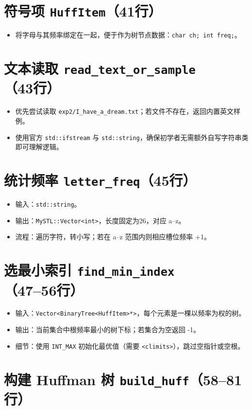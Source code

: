 \documentclass[12pt]{article}
\begin{document}
\section{符号项 \texttt{HuffItem}（41行）}
\begin{itemize}[leftmargin=1.4em]
  \item 将字母与其频率绑定在一起，便于作为树节点数据：\texttt{char ch; int freq;}。
\end{itemize}

\section{文本读取 \texttt{read\_text\_or\_sample}（43行）}
\begin{itemize}[leftmargin=1.4em]
  \item 优先尝试读取 \texttt{exp2/I\_have\_a\_dream.txt}；若文件不存在，返回内置英文样例。
  \item 使用官方 \texttt{std::ifstream} 与 \texttt{std::string}，确保初学者无需额外自写字符串类即可理解逻辑。
\end{itemize}

\section{统计频率 \texttt{letter\_freq}（45行）}
\begin{itemize}[leftmargin=1.4em]
  \item 输入：\texttt{std::string}。
  \item 输出：\texttt{MySTL::Vector<int>}，长度固定为26，对应 a--z。
  \item 流程：遍历字符，转小写；若在 a--z 范围内则相应槽位频率 +1。
\end{itemize}

\section{选最小索引 \texttt{find\_min\_index}（47--56行）}
\begin{itemize}[leftmargin=1.4em]
  \item 输入：\texttt{Vector<BinaryTree<HuffItem>*>}，每个元素是一棵以频率为权的树。
  \item 输出：当前集合中根频率最小的树下标；若集合为空返回 -1。
  \item 细节：使用 \texttt{INT\_MAX} 初始化最优值（需要 \texttt{<climits>}），跳过空指针或空根。
\end{itemize}

\section{构建 Huffman 树 \texttt{build\_huff}（58--81行）}
\end{document}
